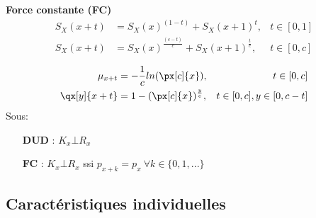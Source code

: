\documentclass[10pt, french]{article}
\begin{document}
\begin{multicols*}{3}
\textbf{Force constante (FC)}
\begin{align*}
S_X(x + t) &= S_X(x)^{(1 - t)} + S_X(x + 1)^t,  &t \in [0, 1] \\
S_X(x + t) &= S_X(x)^{\frac{(c - t)}{c}} + S_X(x + 1)^{\frac{t}{c}},  &t \in [0, c] \\
\end{align*}
\begin{align*}
\mu_{x + t} &= -\frac{1}{c}ln(\px[c]{x}), & t \in[0, c] \\
\qx[y]{x + t} &= 1 - (\px[c]{x})^{\frac{y}{c}}, & t \in[0, c],  y \in [0, c - t] \\
\end{align*}
Sous: 
\begin{enumerate}
	\item[\textbf{DUD} : ] $K_x \bot R_x$
	\item[\textbf{FC} : ] $K_x \bot R_x$ ssi $p_{x + k} = p_{x} \ \forall k \in \{0, 1, ... \}$
\end{enumerate}

\subsection{Caractéristiques individuelles}


\end{multicols*}
\end{document}

